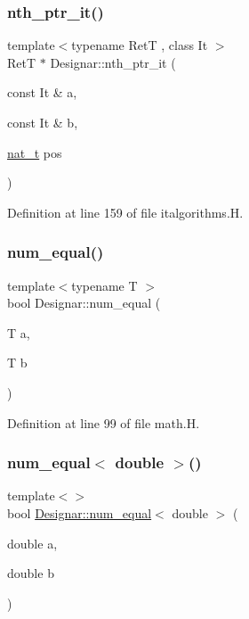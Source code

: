 \subsubsection{\texorpdfstring{nth\+\_\+ptr\+\_\+it()}{nth\_ptr\_it()}}
{\footnotesize\ttfamily template$<$typename RetT , class It $>$ \\
RetT $\ast$ Designar\+::nth\+\_\+ptr\+\_\+it (\begin{DoxyParamCaption}\item[{const It \&}]{a,  }\item[{const It \&}]{b,  }\item[{\hyperlink{namespace_designar_aa72662848b9f4815e7bf31a7cf3e33d1}{nat\+\_\+t}}]{pos }\end{DoxyParamCaption})}



Definition at line 159 of file italgorithms.\+H.

\mbox{\label{namespace_designar_ad193c81ed087e63575903c6775df36b2}} 
\subsubsection{\texorpdfstring{num\+\_\+equal()}{num\_equal()}}
{\footnotesize\ttfamily template$<$typename T $>$ \\
bool Designar\+::num\+\_\+equal (\begin{DoxyParamCaption}\item[{T}]{a,  }\item[{T}]{b }\end{DoxyParamCaption})}



Definition at line 99 of file math.\+H.

\mbox{\label{namespace_designar_abc6408777e04d2c538830bf826901317}} 
\subsubsection{\texorpdfstring{num\+\_\+equal$<$ double $>$()}{num\_equal< double >()}}
{\footnotesize\ttfamily template$<$$>$ \\
bool \hyperlink{namespace_designar_ad193c81ed087e63575903c6775df36b2}{Designar\+::num\+\_\+equal}$<$ double $>$ (\begin{DoxyParamCaption}\item[{double}]{a,  }\item[{double}]{b }\end{DoxyParamCaption})}



